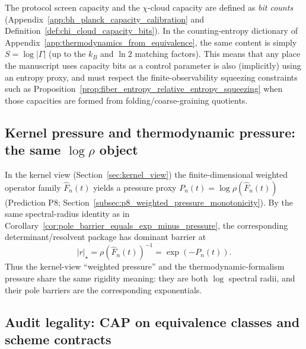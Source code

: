 \begin{remark}\label{rem:rigidity_capacity_bits_entropy}
\AuditTag The protocol screen capacity and the $\chi$-cloud capacity are defined as \emph{bit counts} (Appendix~\ref{app:bh_planck_capacity_calibration} and Definition~\ref{def:chi_cloud_capacity_bits}).
In the counting-entropy dictionary of Appendix~\ref{app:thermodynamics_from_equivalence}, the same content is simply $S=\log|\Gamma|$ (up to the $k_B$ and $\ln 2$ matching factors).
This means that any place the manuscript uses capacity bits as a control parameter is also (implicitly) using an entropy proxy, and must respect the finite-observability squeezing constraints such as Proposition~\ref{prop:fiber_entropy_relative_entropy_squeezing} when those capacities are formed from folding/coarse-graining quotients.
\end{remark}

\subsection{Kernel pressure and thermodynamic pressure: the same \texorpdfstring{$\log\rho$}{log rho} object}
\label{subsec:rigidity_kernel_pressure_alignment}

\begin{corollary}\label{cor:rigidity_kernel_pressure_polebarrier_alignment}
\AuditTag In the kernel view (Section~\ref{sec:kernel_view}) the finite-dimensional weighted operator family $\widehat F_n(t)$ yields a pressure proxy
$P_n(t)=\log\rho(\widehat F_n(t))$ (Prediction P8; Section~\ref{subsec:p8_weighted_pressure_monotonicity}).
By the same spectral-radius identity as in Corollary~\ref{cor:pole_barrier_equals_exp_minus_pressure}, the corresponding determinant/resolvent package has dominant barrier at
\[
|r|_\star=\rho(\widehat F_n(t))^{-1}=\exp(-P_n(t)).
\]
Thus the kernel-view ``weighted pressure'' and the thermodynamic-formalism pressure share the same rigidity meaning: they are both $\log$ spectral radii, and their pole barriers are the corresponding exponentials.
\end{corollary}

\subsection{Audit legality: CAP on equivalence classes and scheme contracts}
\label{subsec:rigidity_legality_cap_scheme}

